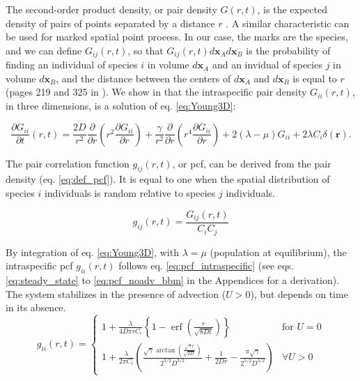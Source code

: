 \documentclass[english]{article}
\DeclareMathOperator\erf{erf}
\begin{document}
The second-order product density, or pair density $G(r,t)$, is the
expected density of pairs of points separated by a distance $r$ \citep{law_population_2003}.
A similar characteristic can be used for marked spatial point process.
In our case, the marks are the species, and we can define $G_{ij}(r,t)$,
so that $G_{ij}(r,t)d\mathbf{x}_{A}d\mathbf{x}_{B}$ is the probability
of finding an individual of species $i$ in volume $d\mathbf{x}_{A}$
and an invidual of species $j$ in volume $d\mathbf{x}_{B}$, and
the distance between the centers of $d\mathbf{x}_{A}$ and $d\mathbf{x}_{B}$
is equal to $r$ (pages 219 and 325 in \citealp{illian2008statistical}).
We show in \citet{picoche_rescience_2022} that the intraspecific
pair density $G_{ii}(r,t)$, in three dimensions, is a solution of
eq. \ref{eq:Young3D}:

\begin{equation}
\frac{\partial G_{ii}}{\partial t}(r,t)=\frac{2D}{r^{2}}\frac{\partial}{\partial r}\left(r^{2}\frac{\partial G_{ii}}{\partial r}\right)+\frac{\gamma}{r^{2}}\frac{\partial}{\partial r}\left(r^{4}\frac{\partial G_{ii}}{\partial r}\right)+2(\lambda-\mu)G_{ii}+2\lambda C_{i}\delta(\boldsymbol{r}).\label{eq:Young3D}
\end{equation}

The pair correlation function $g_{ij}(r,t)$, or pcf, can be derived
from the pair density (eq. \ref{eq:def_pcf}). It is equal to one
when the spatial distribution of species $i$ individuals is random
relative to species $j$ individuals.

\begin{equation}
g_{ij}(r,t)=\frac{G_{ij}(r,t)}{C_{i}C_{j}}\label{eq:def_pcf}
\end{equation}

By integration of eq. \ref{eq:Young3D}, with $\lambda=\mu$ (population
at equilibrium), the intraspecific pcf $g_{ii}(r,t)$ follows eq.
\ref{eq:pcf_intraspecific} (see eqs. \ref{eq:steady_state} to \ref{eq:pcf_noadv_bbm}
in the Appendices for a derivation). The system stabilizes in the
presence of advection ($U>0$), but depends on time in its absence.
\begin{equation}
g_{ii}(r,t)=\begin{cases}
1+\frac{\lambda}{4D\pi rC_{i}}\left\{ 1-\erf\left(\frac{r}{\sqrt{8Dt}}\right)\right\}  & \text{for }U=0\\
1+\frac{\lambda}{2\pi C_{i}}\left(\frac{\sqrt{\gamma}\arctan\left(\frac{\sqrt{\gamma}r}{\sqrt{2D}}\right)}{2^{3/2}D^{3/2}}+\frac{1}{2Dr}-\frac{\pi\sqrt{\gamma}}{2^{5/2}D^{3/2}}\right) & \forall U>0
\end{cases}\label{eq:pcf_intraspecific}
\end{equation}
\end{document}
